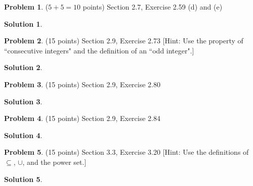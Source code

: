 \documentclass{article}
\theoremstyle{definition}
\newtheorem{problem}{Problem}
\newtheorem*{solution}{Solution}
\begin{document}
\newpage
\begin{problem} ($5+5=10$ points) Section 2.7, Exercise 2.59 (d) and (e)
\end{problem}
\begin{solution} 
\end{solution}

\newpage
\begin{problem} (15 points) Section 2.9, Exercise 2.73
[Hint: Use the property of ``consecutive integers" and the definition of an ``odd integer".]
\end{problem}
\begin{solution} 
\end{solution}

\newpage
\begin{problem} (15 points) Section 2.9, Exercise 2.80 
\end{problem}
\begin{solution}
\end{solution}

\newpage
\begin{problem} (15 points) Section 2.9, Exercise 2.84 
\end{problem}
\begin{solution} 
\end{solution}

\newpage
\begin{problem} (15 points) Section 3.3, Exercise 3.20 
[Hint: Use the definitions of $\subseteq$, $\cup$, and the power set.]
\end{problem}
\begin{solution} 
\end{solution}
\end{document}
